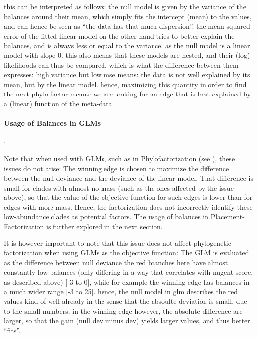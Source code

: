this can be interpreted as follows: the null model is given by the variance of the balances around their mean,
which simply fits the intercept (mean) to the values, and can hence be seen as ``the data has that much dispersion''.
the mean squared error of the fitted linear model on the other hand tries to better explain the balances,
and is always less or equal to the variance, as the null model is a linear model with slope $0$.
this also means that these models are nested, and their (log) likelihoods can thus be compared,
which is what the difference between them expresses: high variance but low mse means: the data is not well explained
by its mean, but by the linear model. hence, maximizing this quantity in order to find the next phylo factor means:
we are looking for an edge that is best explained by a (linear) function of the meta-data.



\paragraph{Usage of Balances in GLMs}
\label{sec:Factorization:sub:Methods:sub:GLMs:par:Balances}

:

Note that when used with \acp{GLM}, such as in Phylofactorization (see ), these issues do not arise:
The winning edge is chosen to maximize the difference between the null deviance and the deviance of the linear model.
That difference is small for clades with almost no mass (such as the ones affected by the issue above), %
so that the value of the objective function for such edges is lower than for edges with more mass.
Hence, the factorization does not incorrectly identify these low-abundance clades as potential factors.
The usage of balances in Placement-Factorization is further explored in the next section.




It is however important to note that this issue does not affect phylogenetic factorization
when using \acp{GLM} as the objective function:
The \ac{GLM} is evaluated as the difference between null deviance
the red branches here have almost constantly low balances (only differing in a way that correlates with nugent score,
as described above) [-3 to 0], while for example the winning edge has balances in a much wider range [-3 to 25].
hence, the null model in glm describes the red values kind of well already
in the sense that the absoulte deviation is small, due to the small numbers.
in the winning edge however, the absolute difference are larger, so that the gain (null dev minus dev) yields
larger values, and thus better ``fits''.

